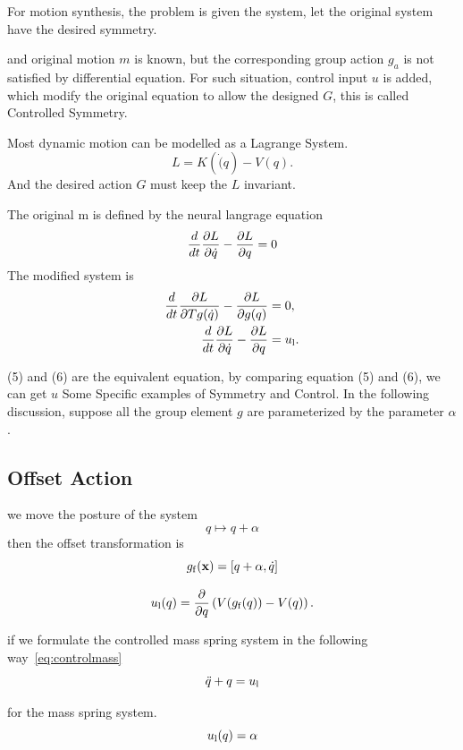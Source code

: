 For motion synthesis, the problem is given the system, let the original system have the desired symmetry.

 and original motion $m$ is known, but the corresponding group action $g_a$ is not satisfied by differential equation.
For such situation, control input $u$  is added, which modify the original equation to allow the designed $G$, this is called Controlled Symmetry.

Most dynamic motion can be modelled as a Lagrange System. 
\[
L=K(\dot(q)-V(q).
\]
And the desired action $G$ must keep the $L$ invariant. 

The original m is defined by the neural langrage equation
\begin{equation}
\frac{d}{dt} \frac{\partial L}{\partial \dot{q}} - \frac{\partial L}{\partial q} = 0
\label{eq:uncontrolled_euler_lagrange}
\end{equation}
The modified system is 
\begin{align}
\frac{d}{dt} \frac{\partial L}{\partial Tg(\dot{q})} - \frac{\partial L}{\partial g(q)}&=0,\label{eq:liegroup_euler_lagrange}\\
\frac{d}{dt} \frac{\partial L}{\partial \dot{q}} - \frac{\partial L}{\partial q}&=u_{\mathrm{l}}. \label{eq:controlled_euler_lagrange}
\end{align}


(5) and (6) are the equivalent equation, by comparing  equation (5) and (6), we can get $u$
Some Specific examples of Symmetry and Control.
In the following discussion, suppose all the group element $g$ are parameterized by the parameter $\alpha$.

\subsection*{ Offset Action}
we move the posture of the system 
\[
q \mapsto q+\alpha
\]
then the offset transformation is
\[
g_{\mathrm{f}}(\mathbf{x}) = [q+\alpha,\dot{q}]
\]


\begin{equation}
u_{\mathrm{l}}(q) = \frac{\partial}{\partial q} \left(V(g_{\mathrm{f}}(q)) - V(q)\right).
\end{equation}

if we formulate the controlled mass spring system in the following way~\ref{eq:controlmass}
\begin{equation}
\label{eq:controlmass}
\ddot{q}+q=u_{\mathrm{l}}
\end{equation}

for the mass spring system.
\[
u_{\mathrm{l}}(q)=\alpha
\]

